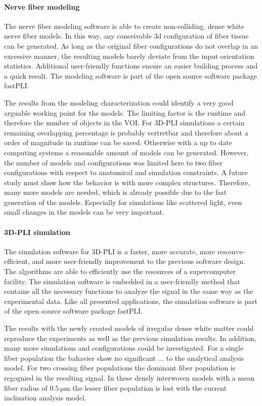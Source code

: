 \paragraph{Nerve fiber modeling} %
The nerve fiber modeling software is able to create non-colliding, dense white nerve fiber models.
In this way, any conceivable 3d configuration of fiber tissue can be generated.
As long as the original fiber configurations do not overlap in an excessive manner, the resulting models barely deviate from the input orientation statistics.
Additional user-friendly functions ensure an easier building process and a quick result.
The modeling software is part of the open source software package \ac{fastPLI}.
\par
% 
The results from the modeling characterization could identify a very good arguable working point for the models.
The limiting factor is the runtime and therefore the number of objects in the \ac{VOI}.
For \ac{3D-PLI} simulations a certain remaining overlapping percentage is probably vertretbar and therefore about a order of magnitude in runtime can be saved.
Otherwise with a up to date computing systems a reasonable amount of models can be generated.
However, the number of models and configurations was limited here to two fiber configurations with respect to anatomical and simulation constraints.
A future study must show how the behavior is with more complex structures.
Therefore, many more models are needed, which is already possible due to the fast generation of the models.
Especially for simulations like scattered light, even small changes in the models can be very important.
%  
\paragraph{\acs{3D-PLI} simulation} %
The simulation software for \ac{3D-PLI} is a faster, more accurate, more resource-efficient, and more user-friendly improvement to the previous software design.
The algorithms are able to efficiently use the resources of a supercomputer facility.
The simulation software is embedded in a user-friendly \python{} method that contains all the necessary functions to analyze the signal in the same way as the experimental data.
Like all presented applications, the simulation software is part of the open source software package \ac{fastPLI}.
\par
% 
The results with the newly created models of irregular dense white matter could reproduce the experiments as well as the previous simulation results.
In addition, many more simulations and configurations could be investigated.
For a single fiber population the bahavier show no significant ... to the analytical analysis model.
For two crossing fiber populations the dominant fiber population is regognied in the resulting signal.
In these densly interwoven models with a mean fiber radius of $\SI{0.5}{\micro\meter}$ the lesser fiber population is lost with the current inclination analysis model.
\par
%
